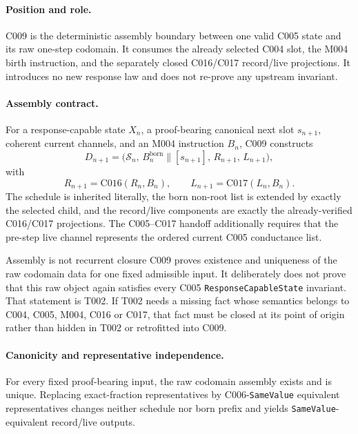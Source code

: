 
\paragraph*{Position and role.}
C009 is the deterministic assembly boundary between one valid C005 state and
its raw one-step codomain.  It consumes the already selected C004 slot, the
M004 birth instruction, and the separately closed C016/C017 record/live
projections.  It introduces no new response law and does not re-prove any
upstream invariant.

\paragraph*{Assembly contract.}
For a response-capable state $X_n$, a proof-bearing canonical next slot
$s_{n+1}$, coherent current channels, and an M004 instruction $B_n$, C009
constructs
\[
  D_{n+1}=\bigl(\mathcal S_n,\,B_n^{\mathrm{born}}\mathbin{\|}[s_{n+1}],\,
    R_{n+1},\,L_{n+1}\bigr),
\]
with
\[
  R_{n+1}=\mathrm{C016}(R_n,B_n),\qquad
  L_{n+1}=\mathrm{C017}(L_n,B_n).
\]
The schedule is inherited literally, the born non-root list is extended by
exactly the selected child, and the record/live components are exactly the
already-verified C016/C017 projections.  The C005--C017 handoff additionally
requires that the pre-step live channel represents the ordered current C005
conductance list.

\begin{cnnaInfoBox}{Assembly is not recurrent closure}
C009 proves existence and uniqueness of the raw codomain data for one fixed
admissible input.  It deliberately does not prove that this raw object again
satisfies every C005 \texttt{ResponseCapableState} invariant.  That statement is
T002.  If T002 needs a missing fact whose semantics belongs to C004, C005,
M004, C016 or C017, that fact must be closed at its point of origin rather than
hidden in T002 or retrofitted into C009.
\end{cnnaInfoBox}

\paragraph*{Canonicity and representative independence.}
For every fixed proof-bearing input, the raw codomain assembly exists and is
unique.  Replacing exact-fraction representatives by C006-\texttt{SameValue}
equivalent representatives changes neither schedule nor born prefix and yields
\texttt{SameValue}-equivalent record/live outputs.

